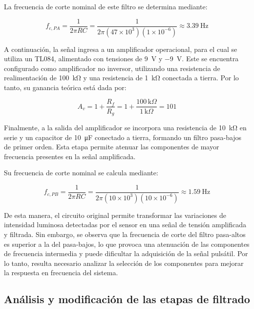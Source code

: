 \documentclass[10pt]{article}
\begin{document}
La frecuencia de corte nominal de este filtro se determina mediante:

\begin{equation}
    f_{c,PA} = \frac{1}{2\pi RC}
    = \frac{1}{2\pi(47\times10^3)(1\times10^{-6})}
    \approx \SI{3.39}{\hertz}
\end{equation}

A continuación, la señal ingresa a un amplificador operacional, para el cual se utiliza un TL084, alimentado con tensiones de \SI{+9}{\volt} y \SI{-9}{\volt}. Este se encuentra configurado como amplificador no inversor, utilizando una resistencia de realimentación de \SI{100}{\kilo\ohm} y una resistencia de \SI{1}{\kilo\ohm} conectada a tierra. Por lo tanto, su ganancia teórica está dada por:

\begin{equation}
    A_v = 1 + \frac{R_f}{R_g}
    = 1 + \frac{100\,\text{k}\Omega}{1\,\text{k}\Omega}
    = 101
\end{equation}

Finalmente, a la salida del amplificador se incorpora una resistencia de \SI{10}{\kilo\ohm} en serie y un capacitor de \SI{10}{\micro\farad} conectado a tierra, formando un filtro pasa-bajos de primer orden. Esta etapa permite atenuar las componentes de mayor frecuencia presentes en la señal amplificada.

Su frecuencia de corte nominal se calcula mediante:

\begin{equation}
    f_{c,PB} = \frac{1}{2\pi RC}
    = \frac{1}{2\pi(10\times10^3)(10\times10^{-6})}
    \approx \SI{1.59}{\hertz}
\end{equation}

De esta manera, el circuito original permite transformar las variaciones de intensidad luminosa detectadas por el sensor en una señal de tensión amplificada y filtrada. Sin embargo, se observa que la frecuencia de corte del filtro pasa-altos es superior a la del pasa-bajos, lo que provoca una atenuación de las componentes de frecuencia intermedia y puede dificultar la adquisición de la señal pulsátil. Por lo tanto, resulta necesario analizar la selección de los componentes para mejorar la respuesta en frecuencia del sistema.


\subsection{Análisis y modificación de las etapas de filtrado}
\end{document}
